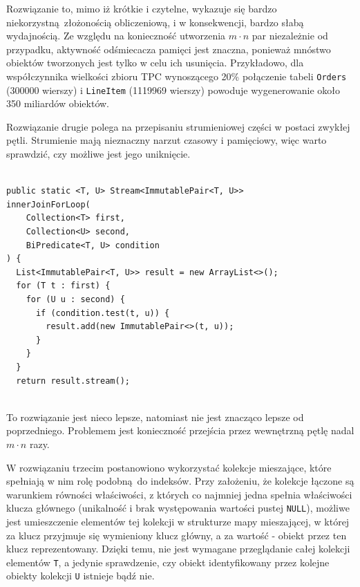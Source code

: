 \documentclass[12pt,twoside,openright]{extarticle}
\begin{document}
    Rozwiązanie to, mimo iż krótkie i czytelne, wykazuje się bardzo niekorzystną złożonością obliczeniową, i w konsekwencji, bardzo słabą wydajnością. Ze względu na konieczność utworzenia $ m \cdot n $ par niezależnie od przypadku, aktywność odśmiecacza pamięci jest znaczna, ponieważ mnóstwo obiektów tworzonych jest tylko w celu ich usunięcia. Przykładowo, dla współczynnika wielkości zbioru TPC wynoszącego 20\% połączenie tabeli \texttt{Orders} (300000 wierszy) i \texttt{LineItem} (1119969 wierszy) powoduje wygenerowanie około 350 miliardów obiektów.

    Rozwiązanie drugie polega na przepisaniu strumieniowej części w postaci zwykłej pętli. Strumienie mają nieznaczny narzut czasowy i pamięciowy, więc warto sprawdzić, czy możliwe jest jego uniknięcie.

\begin{lstlisting}[label=join2, caption=Propozycja rozwiązania nr 2]

public static <T, U> Stream<ImmutablePair<T, U>>
innerJoinForLoop(
    Collection<T> first,
    Collection<U> second,
    BiPredicate<T, U> condition
) {
  List<ImmutablePair<T, U>> result = new ArrayList<>();
  for (T t : first) {
    for (U u : second) {
      if (condition.test(t, u)) {
        result.add(new ImmutablePair<>(t, u));
      }
    }
  }
  return result.stream();
    

\end{lstlisting}

    To rozwiązanie jest nieco lepsze, natomiast nie jest znacząco lepsze od poprzedniego. Problemem jest konieczność przejścia przez wewnętrzną pętlę nadal $ m \cdot n $ razy.

    W rozwiązaniu trzecim postanowiono wykorzystać kolekcje mieszające, które spełniają w nim rolę podobną do indeksów. Przy założeniu, że kolekcje łączone są warunkiem równości właściwości, z których co najmniej jedna spełnia właściwości klucza głównego (unikalność i brak występowania wartości pustej \texttt{NULL}), możliwe jest umieszczenie elementów tej kolekcji w strukturze mapy mieszającej, w której za klucz przyjmuje się wymieniony klucz główny, a za wartość - obiekt przez ten klucz reprezentowany. Dzięki temu, nie jest wymagane przeglądanie całej kolekcji elementów \texttt{T}, a jedynie sprawdzenie, czy obiekt identyfikowany przez kolejne obiekty kolekcji \texttt{U} istnieje bądź nie.
\end{document}
